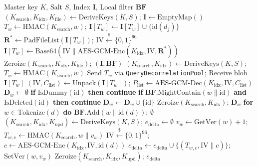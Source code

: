 \documentclass[10pt,conference]{IEEEtran}
\newenvironment{revised}{\color{revcolor}}{}
\begin{document}
\begin{revised}
\begin{algorithm}[t]
\caption{VisioCrypt Core Operational Protocols}
\label{alg:protocols}
\scriptsize
\begin{algorithmic}[1]
\Require Master key $K$, Salt $S$, Index $\mathbf{I}$, Local filter $\mathbf{BF}$
    \State $(K_{\text{search}}, K_{\text{idx}}, K_{\text{file}}) \gets \text{DeriveKeys}(K, S)$; $\mathbf{I} \gets \text{EmptyMap}()$
        \State $T_w \gets \text{HMAC}(K_{\text{search}}, w)$; $\mathbf{I}[T_w] \gets \mathbf{I}[T_w] \cup \{\text{id}(d_j)\}$
    \EndFor
        \State $\mathbf{R}^* \gets \text{PadFileList}(\mathbf{I}[T_w])$; $\text{IV} \xleftarrow{\$} \{0,1\}^{96}$
        \State $\mathbf{I}[T_w] \gets \text{Base64}(\text{IV} \parallel \text{AES-GCM-Enc}(K_{\text{idx}}, \text{IV}, \mathbf{R}^*))$
    \EndFor
    \State $\text{Zeroize}(K_{\text{search}}, K_{\text{idx}}, K_{\text{file}})$; \Return $(\mathbf{I}, \mathbf{BF})$
\EndProcedure
{}
    \State $(K_{\text{search}}, K_{\text{idx}}) \gets \text{DeriveKeys}(K, S)$; $T_w \gets \text{HMAC}(K_{\text{search}}, w)$
    \State Send $T_w$ via \texttt{QueryDecorrelationPool}; Receive blob $\mathbf{I}[T_w]$
    \State $(\text{IV}, C_{\text{list}}) \gets \text{Unpack}(\mathbf{I}[T_w])$; $P_{\text{list}} \gets \text{AES-GCM-Dec}(K_{\text{idx}}, \text{IV}, C_{\text{list}})$
    \State $\mathbf{D}_w \gets \emptyset$
        \State \textbf{if} $\text{IsDummy}(\text{id})$ \textbf{then continue}
        \State \textbf{if} $\mathbf{BF}.\text{MightContain}(w \parallel \text{id})$ \textbf{and} $\text{IsDeleted}(\text{id})$ \textbf{then continue}
        \State $\mathbf{D}_w \gets \mathbf{D}_w \cup \{\text{id}\}$
    \EndFor
    \State $\text{Zeroize}(K_{\text{search}}, K_{\text{idx}})$; \Return $\mathbf{D}_w$
\EndProcedure
{}
        \State \textbf{for} $w \in \text{Tokenize}(d)$ \textbf{do} $\mathbf{BF}.\text{Add}(w \parallel \text{id}(d))$; \Return $\emptyset$
    \EndIf
    \State $(K_{\text{search}}, K_{\text{idx}}, K_{\text{upd}}) \gets \text{DeriveKeys}(K, S)$; $e_{\text{delta}} \gets \emptyset$
        \State $v_w \gets \text{GetVer}(w) + 1$; $T_{w,v} \gets \text{HMAC}(K_{\text{search}}, w \parallel v_w)$
        \State $\text{IV} \xleftarrow{\$} \{0,1\}^{96}$; $c \gets \text{AES-GCM-Enc}(K_{\text{idx}}, \text{IV}, \text{id}(d))$
        \State $e_{\text{delta}} \gets e_{\text{delta}} \cup \{(T_{w,v}, \text{IV} \parallel c)\}$; $\text{SetVer}(w, v_w)$
    \EndFor
    \State $\text{Zeroize}(K_{\text{search}}, K_{\text{idx}}, K_{\text{upd}})$; \Return $e_{\text{delta}}$
\EndProcedure
\end{algorithmic}
\end{algorithm}


\end{revised}
\end{document}
